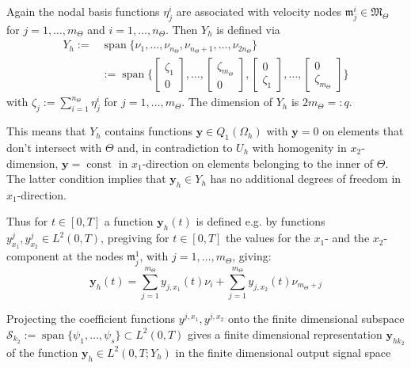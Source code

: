 \documentclass[a4paper,10pt,BCOR=15mm]{scrbook}
\DeclareMathOperator{\spann}{span}
\DeclareMathOperator{\const}{const}
\begin{document}
Again the nodal basis functions $\eta_j^i$ are associated with velocity nodes $\mathfrak m_j^i \in \mathfrak M_\Theta$ for $j=1,\dotsc,m_\Theta$ and $i=1,\dotsc,n_\Theta$. Then $Y_h$ is defined via
 \begin{align*}
 Y_h := &\spann \bigl \{ \nu_{1}, \dotsc ,\nu_{n_\Theta}, \nu_{n_\Theta +1}, \dotsc , \nu_{2n_\Theta}  \bigr \}\\
&:=\spann \bigl \{ \begin{bmatrix} \zeta_1 \\ 0 \end{bmatrix}, \dotsc , \begin{bmatrix} \zeta_{m_\Theta} \\ 0 \end{bmatrix},\begin{bmatrix} 0 \\ \zeta_1 \end{bmatrix}, \dotsc , \begin{bmatrix} 0 \\ \zeta_{m_\Theta} \end{bmatrix} \bigr \}
\end{align*}
with $ \zeta_j := \sum _{i=1}^{n_\Theta}\eta_j^i $ for $j=1,\dotsc,m_\Theta$. The dimension of $Y_h$ is $2m_\Theta =: q$.

This means that $Y_h$ contains functions $\mathbf y \in Q_1(\Omega_h)$ with $\mathbf y=0$ on elements that don't intersect with $\Theta$ and, in contradiction to $U_h$ with homogenity in $x_2$-dimension, $\mathbf y = \const $ in $x_1$-direction on elements belonging to the inner of $\Theta$. The latter condition implies that $\mathbf y_h \in Y_h$ has no additional degrees of freedom in $x_1$-direction. 

Thus for $t\in[0,T]$ a function $\mathbf y_h(t)$ is defined e.g. by functions $y^j_{x_1},y^j_{x_2} \in L^2(0,T)$, pregiving for $t\in [0,T]$ the values for the $x_1$- and the $x_2$-component at the nodes $\mathfrak m_j^1$, with $j=1,\dotsc,m_\Theta$, giving:
\begin{equation*}
 \mathbf y_h(t) = \sum _{j=1}^{m_\Theta}y_{j,x_1}(t)\nu_i+ \sum _{j=1}^{m_\Theta}y_{j,x_2}(t)\nu_{m_\Theta+j}
\end{equation*}


Projecting the coefficient functions $y^{j,x_1},y^{j,x_2}$ onto the finite dimensional subspace $\mathcal S_{k_2} := \spann \bigl \{ \psi_1, \dotsc ,\psi_s \bigr \} \subset  L^2(0,T)$ gives a finite dimensional representation $\mathbf y_{hk_2}$ of the function $\mathbf y_h \in L^2(0,T;Y_h)$ in the finite dimensional output signal space
\end{document}
